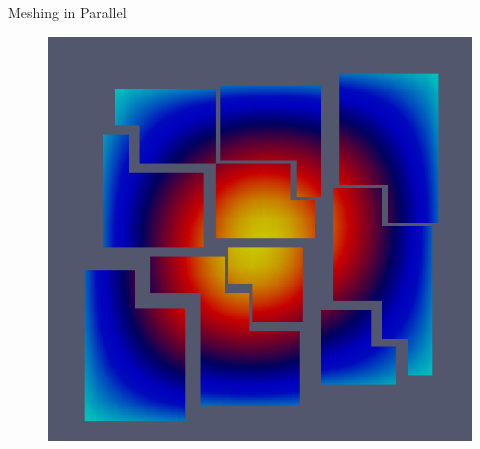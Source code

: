 \begin{frame}{Meshing in Parallel}
\begin{figure}
		\includegraphics*[scale=0.45]{graphic/mesh/decomp-solu}
	\end{figure}
\end{frame}